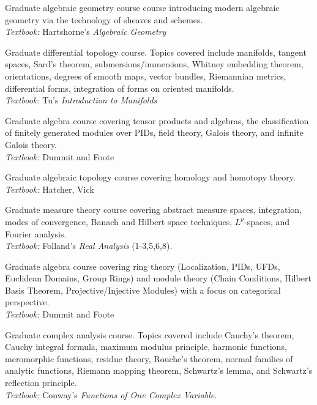 \documentclass[11pt,letterpaper,sans]{moderncv}
\begin{document}
%
  {Graduate algebraic geometry course course introducing modern algebraic geometry via the technology of sheaves and schemes.  \\ \emph{Textbook: }Hartshorne's \emph{Algebraic Geometry}}

%
  {Graduate differential topology course. Topics covered include manifolds, tangent spaces, Sard's theorem, submersions/immersions, Whitney embedding theorem, orientations, degrees of smooth maps, vector bundles, Riemannian metrics, differential forms, integration of forms on oriented manifolds. \\ \emph{Textbook: }Tu's \emph{Introduction to Manifolds}}

%
  {Graduate algebra course covering tensor products and algebras, the classification of finitely generated modules over PIDs, field theory, Galois theory, and infinite Galois theory.  \\ \emph{Textbook: }Dummit and Foote}

%
  {Graduate algebraic topology course covering homology and homotopy theory.  \\ \emph{Textbook: }Hatcher, Vick}

%
  {Graduate measure theory course covering abstract measure spaces, integration, modes of convergence, Banach and Hilbert space techniques, $L^p$-spaces, and Fourier analysis. \\ \emph{Textbook: }Folland's \emph{Real Analysis} (1-3,5,6,8).}

%
  {Graduate algebra course covering ring theory (Localization, PIDs, UFDs, Euclidean Domains, Group Rings) and module theory (Chain Conditions, Hilbert Basis Theorem, Projective/Injective Modules) with a focus on categorical perspective.   \\ \emph{Textbook: }Dummit and Foote}

%
  {Graduate complex analysis course. Topics covered include Cauchy’s theorem, Cauchy integral formula, maximum modulus principle, harmonic functions, meromorphic functions, residue theory, Rouche's theorem, normal families of analytic functions, Riemann mapping theorem, Schwartz's lemma, and Schwartz's reflection principle. \\ \emph{Textbook: }Conway's \emph{Functions of One Complex Variable}.}
\end{document}

